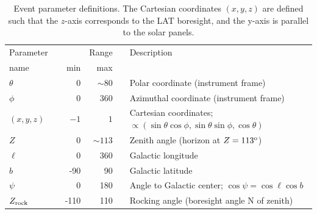 \documentclass[aps,twocolumn,prd,superscriptaddress,showpacs,nofootinbib,fixfloat]{revtex4}
\newcommand{\degree}{^{\rm o}}
\newcommand{\zrock}{$Z_{\rm rock}$}
\begin{document}








\begin{table}
  \begin{center}
    \begin{tabular}{lcrrcl}
      \hline
      Parameter &\hphantom{i}& & Range &\hphantom{i}&  Description\\
      name      && min & max &&            \\
      \hline
      $\theta$ &&    0 &  $\sim80$ && Polar coordinate (instrument frame) \\
      $\phi$   &&    0 &       360 && Azimuthal coordinate (instrument frame) \\
      $(x,y,z)$&&  $-1$& $1$ && Cartesian coordinates;
      $\propto(\sin\theta\cos\phi, \sin\theta\sin\phi, \cos\theta)$\\
      $Z$      &&    0 & $\sim113$ && Zenith angle (horizon at $Z=113\degree$) \\
      $\ell$   &&    0 & 360 && Galactic longitude \\
      $b$      &&  -90 &  90 && Galactic latitude \\
      $\psi$   &&    0 & 180 && Angle to Galactic center; $\cos\psi=\cos\ell\cos b$ \\
      \zrock\  && -110 & 110 && Rocking angle (boresight angle N of zenith) \\
      \hline
    \end{tabular}
    \caption{Event parameter definitions. The Cartesian coordinates $(x, y, z)$ are
    defined such that the $z$-axis corresponds to the LAT boresight, and the
    y-axis is parallel to the solar panels.}
    \label{tab:parameters}
  \end{center}
\end{table}
\end{document}
